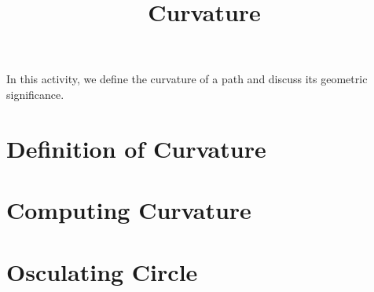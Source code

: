 \documentclass{ximera}
\title{Curvature}
\begin{document}
\begin{abstract}
\end{abstract}
\maketitle

In this activity, we define the curvature of a path and discuss its geometric significance.

\section{Definition of Curvature}

\section{Computing Curvature}

\section{Osculating Circle}
\end{document}
